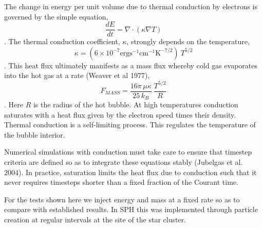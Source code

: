 \documentclass[12pt]{report}
\begin{document}
\Huge
The change in energy per unit volume due to thermal conduction by electrons is
governed by the simple equation,
$$\frac{dE}{dt} = \nabla\cdot (\kappa \nabla T)$$.
The thermal conduction coefficient, $\kappa$, strongly depends on the
temperature,
$$\kappa = (6\times10^{-7}  \mathrm{erg s^{-1} cm^{-1} K^{-7/2}})\ T^{5/2}$$.
This heat flux ultimately manifests as a mass flux whereby cold gas evaporates
into the hot gas at a rate (Weaver et al 1977),
$$F_{MASS} = \frac{16 \pi\, \mu \kappa}{25\,k_B}\ \frac{T^{5/2}}{R}$$.
Here $R$ is the radius of the hot bubble.  At high temperatures conduction saturates
with a heat flux given by the electron speed times their density.  
Thermal conduction is a self-limiting process.  This regulates
the temperature of the bubble interior.

Numerical simulations with conduction must take care to ensure that timestep
criteria are defined so as to integrate these equations stably (Jubelgas et al.
2004).  In practice, saturation limits the heat flux due to conduction such that it never requires
timesteps shorter than a fixed fraction of the Courant time.

For the tests shown here we inject energy and mass at a fixed rate so as to compare with established results.  In SPH this was implemented through particle creation at regular intervals at the site of the star cluster.
\end{document}

